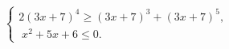 \begin{ex}[type=ineq_system]
	\begin{condition}
		$\begin{cases} 2(3x + 7)^4\geqslant(3x + 7)^3 + (3x +7)^5  ,\\
			\;x^2 + 5x + 6\leqslant0  .
		\end{cases}$
	\end{condition}
\end{ex}